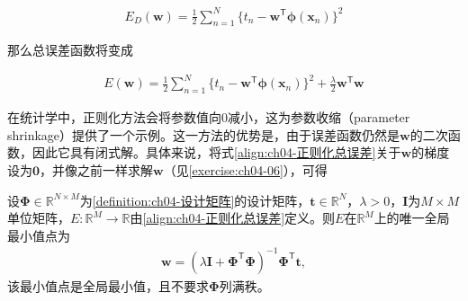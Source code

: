 \documentclass[../../main.tex]{subfiles}
\begin{document}
\begin{align}
  E_D(\boldsymbol{w})=\frac{1}{2}\sum_{n=1}^{N}\bigl\{t_n-\boldsymbol{w}^{\mathsf{T}}\boldsymbol{\phi}(\boldsymbol{x}_n)\bigr\}^2
  \label{align:ch04-平方和误差重述}
\end{align}

那么总误差函数将变成

\begin{align}
  E(\boldsymbol{w})=\frac{1}{2}\sum_{n=1}^{N}\bigl\{t_n-\boldsymbol{w}^{\mathsf{T}}\boldsymbol{\phi}(\boldsymbol{x}_n)\bigr\}^2+\frac{\lambda}{2}\boldsymbol{w}^{\mathsf{T}}\boldsymbol{w}
  \label{align:ch04-正则化总误差}
\end{align}

在统计学中，正则化方法会将参数值向$0$减小，这为参数收缩（parameter shrinkage）提供了一个示例。这一方法的优势是，由于误差函数仍然是$\boldsymbol{w}$的二次函数，因此它具有闭式解。具体来说，将式\eqref{align:ch04-正则化总误差}关于$\boldsymbol{w}$的梯度设为$\boldsymbol{0}$，并像之前一样求解$\boldsymbol{w}$（见\cref{exercise:ch04-06}），可得

\begin{proposition}[正则化最小二乘的闭式解]\label{proposition:ch04-正则化解}
设$\boldsymbol{\Phi}\in\mathbb{R}^{N\times M}$为\cref{definition:ch04-设计矩阵}的设计矩阵，$\boldsymbol{t}\in\mathbb{R}^{N}$，$\lambda>0$，$\boldsymbol{I}$为$M\times M$单位矩阵，$E:\mathbb{R}^{M}\to\mathbb{R}$由\eqref{align:ch04-正则化总误差}定义。则$E$在$\mathbb{R}^{M}$上的唯一全局最小值点为
\begin{align}
  \boldsymbol{w}=(\lambda\boldsymbol{I}+\boldsymbol{\Phi}^{\mathsf{T}}\boldsymbol{\Phi})^{-1}\boldsymbol{\Phi}^{\mathsf{T}}\boldsymbol{t},
  \label{align:ch04-正则化解}
\end{align}
该最小值点是全局最小值，且不要求$\boldsymbol{\Phi}$列满秩。
\end{proposition}
\end{document}
